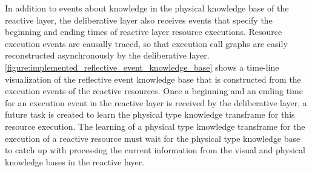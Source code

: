 In addition to events about knowledge in the physical knowledge base
of the reactive layer, the deliberative layer also receives events
that specify the beginning and ending times of reactive layer resource
executions.  Resource execution events are causally traced, so that
execution call graphs are easily reconstructed asynchronously by the
deliberative layer.
{\mbox{\autoref{figure:implemented_reflective_event_knowledge_base}}}
shows a time-line visualization of the reflective event knowledge base
that is constructed from the execution events of the reactive
resources.  Once a beginning and an ending time for an execution event
in the reactive layer is received by the deliberative layer, a future
task is created to learn the physical type knowledge transframe for
this resource execution.  The learning of a physical type knowledge
transframe for the execution of a reactive resource must wait for the
physical type knowledge base to catch up with processing the current
information from the visual and physical knowledge bases in the
reactive layer.
